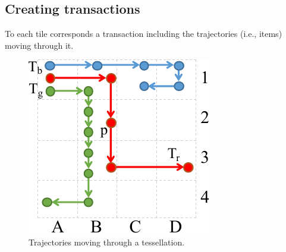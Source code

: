 \documentclass[preprint,12pt,authoryear]{elsarticle} %
\begin{document}
\subsection{Creating transactions}
To each tile corresponds a transaction including the trajectories (i.e., items) moving through it.
%
\begin{figure}[t]
    \centering
    \includegraphics[scale=.6]{patterns2.pdf}
    \caption{Trajectories moving through a tessellation.}
    \label{fig:patterns2}
\end{figure}
\end{document}
